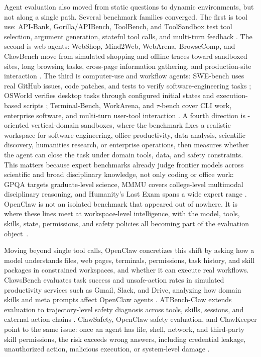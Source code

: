 Agent evaluation also moved from static questions to dynamic environments, but not along a single path. Several benchmark families converged. The first is tool use: API-Bank, Gorilla/APIBench, ToolBench, and ToolSandbox test tool selection, argument generation, stateful tool calls, and multi-turn feedback \citep{li2023apibank,patil2023gorilla,qin2023toolllm,lu2024toolsandbox}. The second is web agents: WebShop, Mind2Web, WebArena, BrowseComp, and ClawBench move from simulated shopping and offline traces toward sandboxed sites, long browsing tasks, cross-page information gathering, and production-site interaction \citep{yao2022webshop,deng2023mind2web,zhou2023webarena,wei2025browsecomp,zhang2026clawbench}. The third is computer-use and workflow agents: SWE-bench uses real GitHub issues, code patches, and tests to verify software-engineering tasks \citep{jimenez2023swebench}; OSWorld verifies desktop tasks through configured initial states and execution-based scripts \citep{xie2024osworld}; Terminal-Bench, WorkArena, and $\tau$-bench cover CLI work, enterprise software, and multi-turn user-tool interaction \citep{merrill2026terminalbench,drouin2024workarena,yao2024taubench}. A fourth direction is \method{}-oriented vertical-domain sandboxes, where the benchmark fixes a realistic workspace for software engineering, office productivity, data analysis, scientific discovery, humanities research, or enterprise operations, then measures whether the agent can close the task under domain tools, data, and safety constraints. This matters because expert benchmarks already judge frontier models across scientific and broad disciplinary knowledge, not only coding or office work: GPQA targets graduate-level science, MMMU covers college-level multimodal disciplinary reasoning, and Humanity's Last Exam spans a wide expert range \citep{rein2023gpqa,yue2023mmmu,phan2025hle}. OpenClaw is not an isolated benchmark that appeared out of nowhere. It is where these lines meet at workspace-level intelligence, with the model, tools, skills, state, permissions, and safety policies all becoming part of the evaluation object~\citep{liu2023bolaa,wang2024mint,lin2023agentsims,yang2024swe,xia2024agentless,wang2025comprehensivesurveyllmagentstack}.

Moving beyond single tool calls, OpenClaw concretizes this shift by asking how a model understands files, web pages, terminals, permissions, task history, and skill packages in constrained workspaces, and whether it can execute real workflows. ClawsBench evaluates task success and unsafe-action rates in simulated productivity services such as Gmail, Slack, and Drive, analyzing how domain skills and meta prompts affect OpenClaw agents \citep{li2026clawsbench}. ATBench-Claw extends evaluation to trajectory-level safety diagnosis across tools, skills, sessions, and external action chains \citep{yang2026atbenchclaw}. ClawSafety, OpenClaw safety evaluation, and ClawKeeper point to the same issue: once an agent has file, shell, network, and third-party skill permissions, the risk exceeds wrong answers, including credential leakage, unauthorized action, malicious execution, or system-level damage \citep{wei2026clawsafety,wang2026openclawsec,liu2026clawkeeper}.

